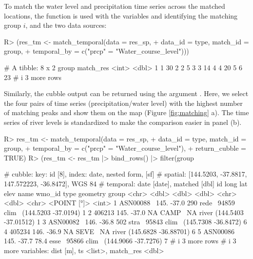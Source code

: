 \documentclass[
  shortnames]{jss}
\begin{document}
To match the water level and precipitation time series across the matched locations, the function  is used with the variables  and  identifying the matching group \(i\), and the two data sources:

\begin{CodeChunk}
\begin{CodeInput}
R> (res_tm <- match_temporal(data = res_sp,
+                           data_id = type, match_id = group,
+                           temporal_by = c("prcp" = "Water_course_level")))
\end{CodeInput}
\begin{CodeOutput}
# A tibble: 8 x 2
  group match_res
  <int>     <dbl>
1     1        30
2     2         5
3     3        14
4     4        20
5     6        23
# i 3 more rows
\end{CodeOutput}
\end{CodeChunk}

Similarly, the cubble output can be returned using the argument . Here, we select the four pairs of time series (precipitation/water level) with the highest number of matching peaks and show them on the map (Figure \ref{fig:matching} a). The time series of river levels is standardized to make the comparison easier in panel (b).

\begin{CodeChunk}
\begin{CodeInput}
R> res_tm <- match_temporal(data =  res_sp,
+                          data_id = type, match_id = group,
+                          temporal_by = c("prcp" = "Water_course_level"),
+                          return_cubble = TRUE)
R> (res_tm <- res_tm |> bind_rows() |> filter(group %
\end{CodeInput}
\begin{CodeOutput}
# cubble:   key: id [8], index: date, nested form, [sf]
# spatial:  [144.5203, -37.8817, 147.572223, -36.8472], WGS 84
# temporal: date [date], matched [dbl]
  id         long   lat  elev name  wmo_id type              geometry group
  <chr>     <dbl> <dbl> <dbl> <chr>  <dbl> <chr>          <POINT [°]> <int>
1 ASN00088~  145. -37.0 290   rede~  94859 clim~  (144.5203 -37.0194)     1
2 406213     145. -37.0  NA   CAMP~     NA river (144.5403 -37.01512)     1
3 ASN00082~  146. -36.8 502   stra~  95843 clim~  (145.7308 -36.8472)     6
4 405234     146. -36.9  NA   SEVE~     NA river (145.6828 -36.88701)     6
5 ASN00086~  145. -37.7  78.4 esse~  95866 clim~  (144.9066 -37.7276)     7
# i 3 more rows
# i 3 more variables: dist [m], ts <list>, match_res <dbl>
\end{CodeOutput}
\end{CodeChunk}
\end{document}
